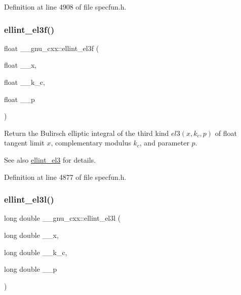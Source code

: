 Definition at line 4908 of file specfun.\+h.

\mbox{\label{group__gnu__math__spec__func_ga66131a8ecc14b5228a73a01121f60a35}} 
\subsubsection{\texorpdfstring{ellint\+\_\+el3f()}{ellint\_el3f()}}
{\footnotesize\ttfamily float \+\_\+\+\_\+gnu\+\_\+cxx\+::ellint\+\_\+el3f (\begin{DoxyParamCaption}\item[{float}]{\+\_\+\+\_\+x,  }\item[{float}]{\+\_\+\+\_\+k\+\_\+c,  }\item[{float}]{\+\_\+\+\_\+p }\end{DoxyParamCaption})\hspace{0.3cm}{\ttfamily [inline]}}

Return the Bulirsch elliptic integral of the third kind $ el3(x,k_c,p) $ of {\ttfamily float} tangent limit $ x $, complementary modulus $ k_c $, and parameter $ p $.

\begin{DoxySeeAlso}{See also}
\hyperlink{group__gnu__math__spec__func_gaac07922e08fdf46cd509ff0cfa9ea1f0}{ellint\+\_\+el3} for details. 
\end{DoxySeeAlso}


Definition at line 4877 of file specfun.\+h.

\mbox{\label{group__gnu__math__spec__func_ga0d90e66f799a2ebe4bec43eef0d53355}} 
\subsubsection{\texorpdfstring{ellint\+\_\+el3l()}{ellint\_el3l()}}
{\footnotesize\ttfamily long double \+\_\+\+\_\+gnu\+\_\+cxx\+::ellint\+\_\+el3l (\begin{DoxyParamCaption}\item[{long double}]{\+\_\+\+\_\+x,  }\item[{long double}]{\+\_\+\+\_\+k\+\_\+c,  }\item[{long double}]{\+\_\+\+\_\+p }\end{DoxyParamCaption})\hspace{0.3cm}{\ttfamily [inline]}}

